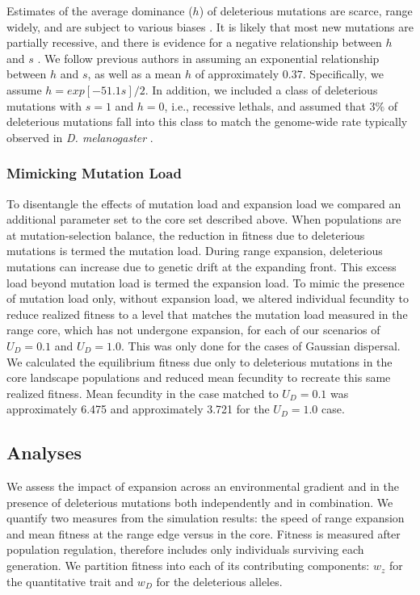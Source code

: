Estimates of the average dominance ($h$) of deleterious mutations are scarce, range widely, and are subject to various biases \citep{Halligan:2009, Agrawal:2011}. It is likely that most new mutations are partially recessive, and there is evidence for a negative relationship between $h$ and $s$ \citep{Agrawal:2011}. We follow previous authors \citep{Lynch:1995, Deng:1996} in assuming an exponential relationship between $h$ and $s$, as well as a mean $h$ of approximately $0.37$. Specifically, we assume $h = exp[-51.1 s]/2$. In addition, we included a class of deleterious mutations with $s = 1$ and $h = 0$, i.e., recessive lethals, and assumed that $3\%$ of deleterious mutations fall into this class to match the genome-wide rate typically observed in \emph{D. melanogaster} \citep{Fry:1999}.


\subsubsection{Mimicking Mutation Load} %
To disentangle the effects of mutation load and expansion load we compared an additional parameter set to the core set described above. When populations are at mutation-selection balance, the reduction in fitness due to deleterious mutations is termed the mutation load. During range expansion, deleterious mutations can increase due to genetic drift at the expanding front. This excess load beyond mutation load is termed the expansion load. To mimic the presence of mutation load only, without expansion load, we altered individual fecundity to reduce realized fitness to a level that matches the mutation load measured in the range core, which has not undergone expansion, for each of our scenarios of $U_D = 0.1$ and $U_D = 1.0$. This was only done for the cases of Gaussian dispersal. We calculated the equilibrium fitness due only to deleterious mutations in the core landscape populations and reduced mean fecundity to recreate this same realized fitness. Mean fecundity in the case matched to $U_D = 0.1$ was approximately 6.475 %
and approximately 3.721 %
for the $U_D = 1.0$ case.



\subsection{Analyses}
We assess the impact of expansion across an environmental gradient and in the presence of deleterious mutations both independently and in combination. We quantify two measures from the simulation results: the speed of range expansion and mean fitness at the range edge versus in the core. Fitness is measured after population regulation, therefore includes only individuals surviving each generation. We partition fitness into each of its contributing components: $w_z$ for the quantitative trait and $w_D$ for the deleterious alleles. 

